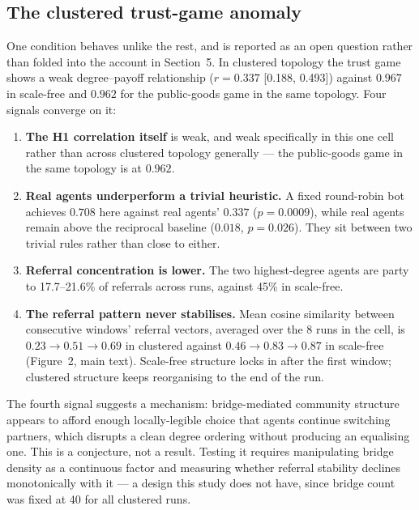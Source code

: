 \documentclass[11pt,a4paper]{article}
\begin{document}
\subsection{The clustered trust-game anomaly}
\label{sec:s10-2}

One condition behaves unlike the rest, and is reported as an open
question rather than folded into the account in Section~5. In
clustered topology the trust game shows a weak degree--payoff
relationship ($r=0.337$ [0.188, 0.493]) against $0.967$ in scale-free
and $0.962$ for the public-goods game in the same topology. Four
signals converge on it:

\begin{enumerate}[leftmargin=1.6em]
  \item \textbf{The H1 correlation itself} is weak, and weak
  specifically in this one cell rather than across clustered topology
  generally --- the public-goods game in the same topology is at
  $0.962$.
  \item \textbf{Real agents underperform a trivial heuristic.} A
  fixed round-robin bot achieves $0.708$ here against real agents'
  $0.337$ ($p=0.0009$), while real agents remain above the reciprocal
  baseline ($0.018$, $p=0.026$). They sit between two trivial rules
  rather than close to either.
  \item \textbf{Referral concentration is lower.} The two
  highest-degree agents are party to 17.7--21.6\% of referrals across
  runs, against 45\% in scale-free.
  \item \textbf{The referral pattern never stabilises.} Mean cosine
  similarity between consecutive windows' referral vectors, averaged
  over the 8 runs in the cell, is $0.23 \rightarrow 0.51 \rightarrow
  0.69$ in clustered against $0.46 \rightarrow 0.83 \rightarrow 0.87$
  in scale-free (Figure~2, main text). Scale-free structure locks in
  after the first window; clustered structure keeps reorganising to
  the end of the run.
\end{enumerate}

The fourth signal suggests a mechanism: bridge-mediated community
structure appears to afford enough locally-legible choice that agents
continue switching partners, which disrupts a clean degree ordering
without producing an equalising one. This is a conjecture, not a
result. Testing it requires manipulating bridge density as a
continuous factor and measuring whether referral stability declines
monotonically with it --- a design this study does not have, since
bridge count was fixed at 40 for all clustered runs.
\end{document}
